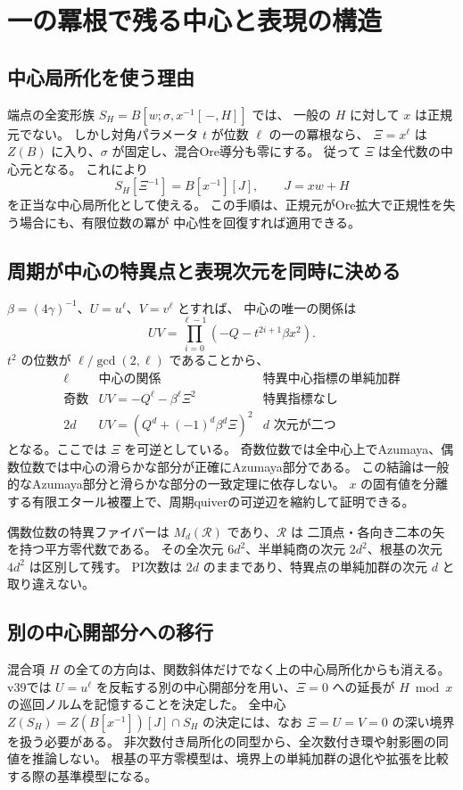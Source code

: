 \section{一の冪根で残る中心と表現の構造}
\label{sec:notes-root-unity-v38}

\subsection{中心局所化を使う理由}

端点の全変形族 $S_H=B[w;\sigma,x^{-1}[\,-,H]]$ では、
一般の $H$ に対して $x$ は正規元でない。
しかし対角パラメータ $t$ が位数 $\ell$ の一の冪根なら、
$\Xi=x^\ell$ は $Z(B)$ に入り、$\sigma$ が固定し、混合Ore導分も零にする。
従って $\Xi$ は全代数の中心元となる。
これにより
\[
 S_H[\Xi^{-1}]=B[x^{-1}][J],\qquad J=xw+H
\]
を正当な中心局所化として使える。
この手順は、正規元がOre拡大で正規性を失う場合にも、有限位数の冪が
中心性を回復すれば適用できる。

\subsection{周期が中心の特異点と表現次元を同時に決める}

$\beta=(4\gamma)^{-1}$、$U=u^\ell$、$V=v^\ell$ とすれば、
中心の唯一の関係は
\[
 UV=\prod_{i=0}^{\ell-1}(-Q-t^{2i+1}\beta x^2).
\]
$t^2$ の位数が $\ell/\gcd(2,\ell)$ であることから、
\[
 \begin{array}{c|c|c}
 \ell&\text{中心の関係}&\text{特異中心指標の単純加群}\\ \hline
 \text{奇数}&UV=-Q^\ell-\beta^\ell\Xi^2&\text{特異指標なし}\\
 2d&UV=(Q^d+(-1)^d\beta^d\Xi)^2&d\text{ 次元が二つ}
 \end{array}
\]
となる。ここでは $\Xi$ を可逆としている。
奇数位数では全中心上でAzumaya、偶数位数では中心の滑らかな部分が正確にAzumaya部分である。
この結論は一般的なAzumaya部分と滑らかな部分の一致定理に依存しない。
$x$ の固有値を分離する有限エタール被覆上で、周期quiverの可逆辺を縮約して証明できる。

偶数位数の特異ファイバーは $M_d(\mathcal R)$ であり、$\mathcal R$ は
二頂点・各向き二本の矢を持つ平方零代数である。
その全次元 $6d^2$、半単純商の次元 $2d^2$、根基の次元 $4d^2$ は区別して残す。
PI次数は $2d$ のままであり、特異点の単純加群の次元 $d$ と取り違えない。

\subsection{別の中心開部分への移行}

混合項 $H$ の全ての方向は、関数斜体だけでなく上の中心局所化からも消える。
v39では $U=u^\ell$ を反転する別の中心開部分を用い、$\Xi=0$ への延長が
$H\bmod x$ の巡回ノルムを記憶することを決定した。
全中心 $Z(S_H)=Z(B[x^{-1}])[J]\cap S_H$ の決定には、なお
$\Xi=U=V=0$ の深い境界を扱う必要がある。
非次数付き局所化の同型から、全次数付き環や射影圏の同値を推論しない。
根基の平方零模型は、境界上の単純加群の退化や拡張を比較する際の基準模型になる。
